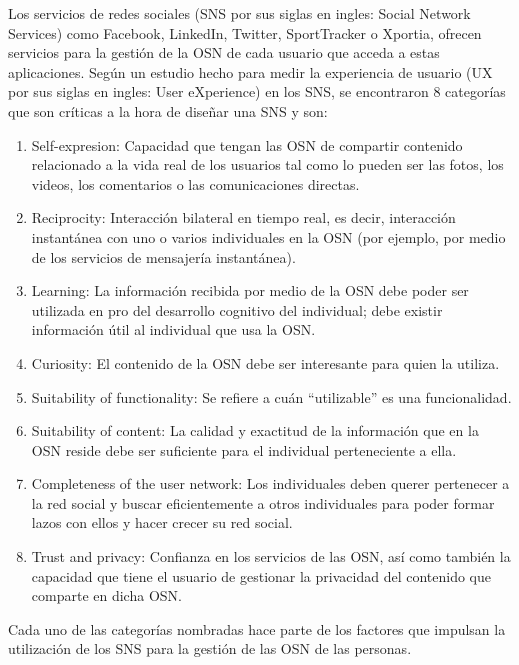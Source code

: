 Los servicios de redes sociales (SNS por sus siglas en ingles: Social Network Services) como Facebook, LinkedIn, Twitter, SportTracker o Xportia, ofrecen servicios para la gestión de la OSN de cada usuario que acceda a estas aplicaciones. Según un estudio hecho para medir la experiencia de usuario (UX por sus siglas en ingles: User eXperience) en los SNS, se encontraron 8 categorías que son críticas a la hora de diseñar una SNS y son:

\begin{enumerate}
  \item Self-expresion: Capacidad que tengan las OSN de compartir contenido relacionado a la vida real de los usuarios tal como lo pueden ser las fotos, los videos, los comentarios o las comunicaciones directas.
  \item Reciprocity: Interacción bilateral en tiempo real, es decir, interacción instantánea con uno o varios individuales en la OSN (por ejemplo, por medio de los servicios de mensajería instantánea).
  \item Learning: La información recibida por medio de la OSN debe poder ser utilizada en pro del desarrollo cognitivo del individual; debe existir información útil al individual que usa la OSN.
  \item Curiosity: El contenido de la OSN debe ser interesante para quien la utiliza.
  \item Suitability of functionality: Se refiere a cuán “utilizable” es una funcionalidad.
  \item Suitability of content: La calidad y exactitud de la información que en la OSN reside debe ser suficiente para el individual perteneciente a ella.
  \item Completeness of the user network: Los individuales deben querer pertenecer a la red social y buscar eficientemente a otros individuales para poder formar lazos con ellos y hacer crecer su red social.
  \item Trust and privacy: Confianza en los servicios de las OSN, así como también la capacidad que tiene el usuario de gestionar la privacidad del contenido que comparte en dicha OSN.\cite[pag.2-3]{social_experience}
\end{enumerate}

Cada uno de las categorías nombradas hace parte de los factores que impulsan la utilización de los SNS para la gestión de las OSN de las personas.

